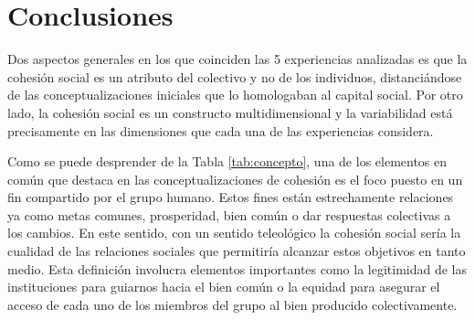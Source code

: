 \documentclass[
  12pt,
]{book}
\begin{document}
\hypertarget{conclusiones}{%
\chapter{Conclusiones}\label{conclusiones}}

Dos aspectos generales en los que coinciden las 5 experiencias analizadas es que la cohesión social es un atributo del colectivo y no de los individuos, distanciándose de las conceptualizaciones iniciales que lo homologaban al capital social. Por otro lado, la cohesión social es un constructo multidimensional y la variabilidad está precisamente en las dimensiones que cada una de las experiencias considera.

Como se puede desprender de la Tabla \ref{tab:concepto}, una de los elementos en común que destaca en las conceptualizaciones de cohesión es el foco puesto en un fin compartido por el grupo humano. Estos fines están estrechamente relaciones ya como metas comunes, prosperidad, bien común o dar respuestas colectivas a los cambios. En este sentido, con un sentido teleológico la cohesión social sería la cualidad de las relaciones sociales que permitiría alcanzar estos objetivos en tanto medio. Esta definición involucra elementos importantes como la legitimidad de las instituciones para guiarnos hacia el bien común o la equidad para asegurar el acceso de cada uno de los miembros del grupo al bien producido colectivamente.

\newpage
\end{document}
